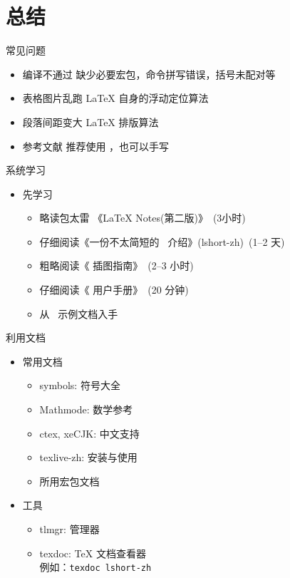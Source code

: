 \section{总结}

\begin{frame}{常见问题}
	\begin{itemize}
		\item \alert{编译不通过} 缺少必要宏包，命令拼写错误，括号未配对等
		\item \alert{表格图片乱跑} \LaTeX{} 自身的浮动定位算法
		\item \alert{段落间距变大} \LaTeX{} 排版算法
		\item \alert{参考文献} 推荐使用 \BibTeX{}，也可以手写 
	\end{itemize}
\end{frame}

\begin{frame}{系统学习}
	\begin{itemize}
		\item 先学习
			\begin{itemize}
        \item 略读包太雷 《\LaTeX{} Notes(第二版)》~(3小时)
				\item 仔细阅读《一份不太简短的~\LaTeXe{} 介绍》(lshort-zh)~(1--2 天)
				\item 粗略阅读《\LaTeXe{} 插图指南》~(2--3 小时)
				\item 仔细阅读《\ThuThesis{} 用户手册》~(20 分钟)
				\item 从~\ThuThesis{} 示例文档入手
			\end{itemize}
	\end{itemize}
\end{frame}

\begin{frame}{利用文档}
	\begin{itemize}
		\item 常用文档
			\begin{itemize}
				\item symbols: 符号大全
				\item Mathmode: 数学参考
				\item ctex, xeCJK: 中文支持
				\item texlive-zh: \TL 安装与使用
				\item 所用宏包文档
			\end{itemize}
		\item 工具
			\begin{itemize}
				\item tlmgr: \TL 管理器
				\item texdoc: \TeX{} 文档查看器\\
					例如：\texttt{texdoc lshort-zh}
			\end{itemize}
	\end{itemize}
\end{frame}


